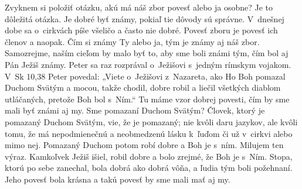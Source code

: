 







Zvyknem si položiť otázku, akú má náš zbor povesť alebo ja osobne? Je to dôležitá otázka. Je dobré byť známy, pokiaľ tie dôvody sú správne. V~dnešnej dobe sa o~cirkvách píše všeličo a často nie dobré. Povesť zboru je povesť ich členov a naopak. Čím si známy Ty alebo ja, tým je známy aj náš zbor. Samozrejme, naším cieľom by malo byť to, aby sme boli známi tým, čím bol aj Pán Ježiš známy. Peter sa raz rozprával o~Ježišovi s~jedným rímskym vojakom. V~Sk 10,38 Peter povedal: „Viete o~Ježišovi z~Nazareta, ako Ho Boh pomazal Duchom Svätým a mocou, takže chodil, dobre robil a liečil všetkých diablom utláčaných, pretože Boh bol s~Ním.“ Tu máme vzor dobrej povesti, čím by sme mali byť známi aj my. Sme pomazaní Duchom Svätým? Človek, ktorý je pomazaný Duchom Svätým, vie, že je pomazaný; nie kvôli daru jazykov, ale kvôli tomu, že má nepodmienečnú a neobmedzenú lásku k~ľuďom či už v~cirkvi alebo mimo nej. Pomazaný Duchom potom robí dobre a Boh je s~ním. Milujem ten výraz. Kamkoľvek Ježiš išiel, robil dobre a bolo zrejmé, že Boh je s~Ním. Stopa, ktorú po sebe zanechal, bola dobrá ako dobrá vôňa, a ľudia tým boli požehnaní. Jeho povesť bola krásna a takú povesť by sme mali mať aj my.

